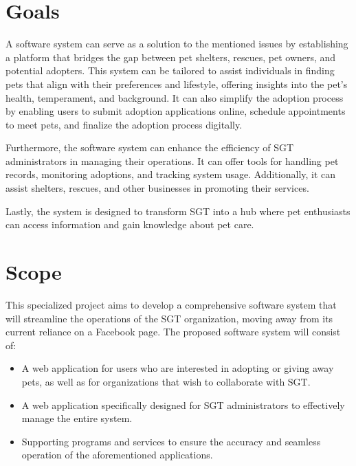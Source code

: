 \section{Goals}

A software system can serve as a solution to the mentioned issues by establishing a platform that bridges the gap between pet shelters, rescues, pet owners, and potential adopters. This system can be tailored to assist individuals in finding pets that align with their preferences and lifestyle, offering insights into the pet’s health, temperament, and background. It can also simplify the adoption process by enabling users to submit adoption applications online, schedule appointments to meet pets, and finalize the adoption process digitally.

Furthermore, the software system can enhance the efficiency of SGT administrators in managing their operations. It can offer tools for handling pet records, monitoring adoptions, and tracking system usage. Additionally, it can assist shelters, rescues, and other businesses in promoting their services.

Lastly, the system is designed to transform SGT into a hub where pet enthusiasts can access information and gain knowledge about pet care.

\section{Scope}

This specialized project aims to develop a comprehensive software system that will streamline the operations of the SGT organization, moving away from its current reliance on a Facebook page. The proposed software system will consist of:
\begin{itemize}
    \item A web application for users who are interested in adopting or giving away pets, as well as for organizations that wish to collaborate with SGT.
    \item	A web application specifically designed for SGT administrators to effectively manage the entire system.
    \item Supporting programs and services to ensure the accuracy and seamless operation of the aforementioned applications.
\end{itemize}

